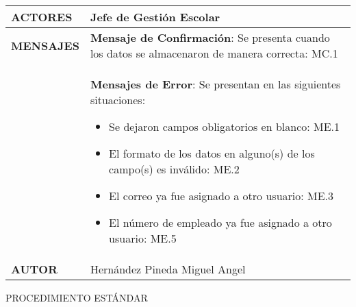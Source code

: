 \begin{longtable}{ | p{6cm} | p{10cm} |}
\hline
\textbf{ACTORES} & Jefe de Gestión Escolar\\
\hline
\textbf{MENSAJES} & \textbf{Mensaje de Confirmación}: Se presenta cuando los datos se almacenaron de manera correcta: MC.1\\ & \textbf{Mensajes de Error}: Se presentan en las siguientes situaciones:\begin{itemize}
    \item Se dejaron campos obligatorios en blanco: ME.1
    \item El formato de los datos en alguno(s) de los campo(s) es inválido: ME.2
    \item El correo ya fue asignado a otro usuario: ME.3
    \item El número de empleado ya fue asignado a otro usuario: ME.5
\end{itemize}\\
\hline
\textbf{AUTOR} & Hernández Pineda Miguel Angel\\
\hline
\end{longtable}
\vspace*{1cm}
\noindent
\Large{PROCEDIMIENTO ESTÁNDAR}
\large{}
